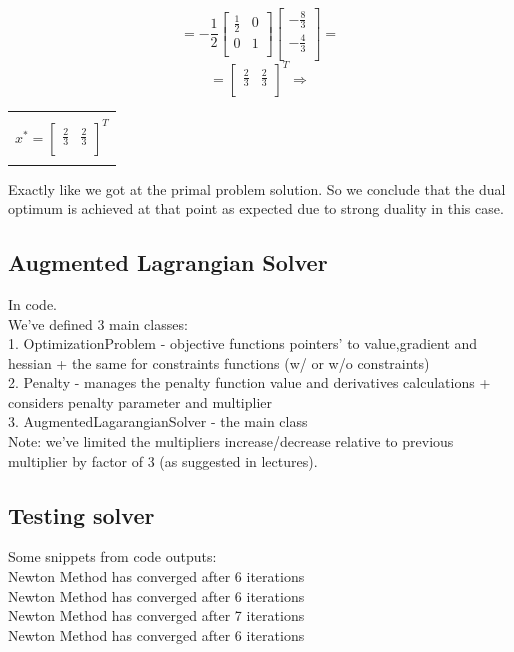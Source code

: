 \documentclass[12pt]{article}
\newcommand{\rectres}[1]{
\begin{center}
\begin{tabular}{ |c| }
\hline
\\
 #1\\
 \\
\hline
\end{tabular}
\end{center}
}
\begin{document}
  $$=-\frac{1}{2}
  \begin{bmatrix}
               \frac{1}{2} & 0 \\
               0 & 1 \\
  \end{bmatrix}\begin{bmatrix}   -\frac{8}{3} \\ -\frac{4}{3}\\ \end{bmatrix}=$$
$$=\begin{bmatrix} \frac{2}{3} & \frac{2}{3}\\ \end{bmatrix}^T \Rightarrow$$

\rectres{$x^*=\begin{bmatrix} \frac{2}{3} & \frac{2}{3}\\ \end{bmatrix}^T$}

Exactly like we got at the primal problem solution. So we conclude that the dual optimum is achieved at that point as expected due to strong duality in this case.

\subsection{Augmented Lagrangian Solver}
In code.\\
We've defined 3 main classes:\\
1. OptimizationProblem - objective functions pointers' to value,gradient and hessian + the same for constraints functions (w/ or w/o constraints)\\
2. Penalty - manages the penalty function value and derivatives calculations + considers penalty parameter and multiplier\\
3. AugmentedLagarangianSolver - the main class\\

Note: we've limited the multipliers increase/decrease relative to previous multiplier by factor of 3 (as suggested in lectures).

\subsection{Testing solver}
Some snippets from code outputs:\\
Newton Method has converged after 6 iterations\\
Newton Method has converged after 6 iterations\\
Newton Method has converged after 7 iterations\\
Newton Method has converged after 6 iterations\\
\end{document}
